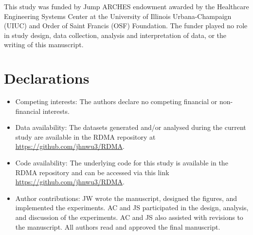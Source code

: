 This study was funded by Jump ARCHES endowment awarded by the Healthcare Engineering Systems Center at the University of Illinois Urbana-Champaign (UIUC) and Order of Saint Francis (OSF) Foundation. The funder played no role in study design, data collection, analysis and interpretation of data, or the writing of this manuscript. 

\section*{Declarations}
\begin{itemize}
\item Competing interests: The authors declare no competing financial or non-financial interests.
\item Data availability: The datasets generated and/or analysed during the current study are available in the RDMA repository at \url{https://github.com/jhnwu3/RDMA}.
\item Code availability: The underlying code for this study is available in the RDMA repository and can be accessed via this link \url{https://github.com/jhnwu3/RDMA}.
\item Author contributions: JW wrote the manuscript, designed the figures, and implemented the experiments. AC and JS participated in the design, analysis, and discussion of the experiments. AC and JS also assisted with revisions to the manuscript. All authors read and approved the final manuscript.
\end{itemize}

\bmhead{}
